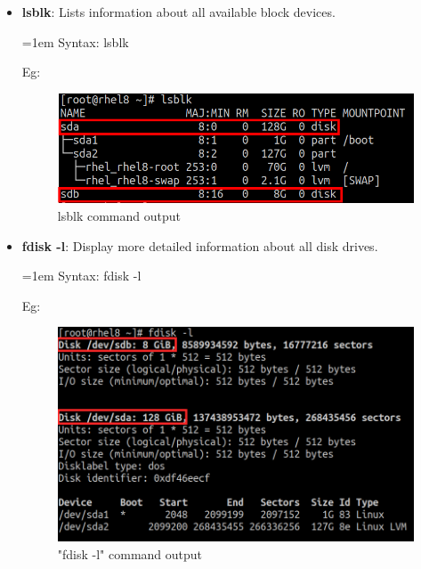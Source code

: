 \setlength{\columnsep}{3pt}
\begin{flushleft}

\bigskip
\begin{itemize}
	\item \textbf{lsblk}: Lists information about all available block devices.
	
	\bigskip
	\begin{tcolorbox}[breakable,notitle,boxrule=-0pt,colback=pink,colframe=pink]
		\color{black}
		\font=1em
		Syntax: lsblk
		\font=4pt
	\end{tcolorbox}
	Eg:
	\begin{figure}[h!]
		\centering
		\includegraphics[scale=0.45]{content/chapter8/images/lsblk.png}
		\caption{lsblk command output}
		\label{fig:lsblk}
	\end{figure}
	
	\item \textbf{fdisk -l}: Display more detailed information about all disk drives.
	\bigskip
	\begin{tcolorbox}[breakable,notitle,boxrule=-0pt,colback=pink,colframe=pink]
		\color{black}
		\font=1em
		Syntax: fdisk -l
		\font=4pt
	\end{tcolorbox}
	Eg:
	\begin{figure}[h!]
		\centering
		\includegraphics[scale=0.45]{content/chapter8/images/fdisk.png}
		\caption{"fdisk -l" command output}
		\label{fig:fdisk}
	\end{figure}
		
	
\end{itemize}
	
	
	
\end{flushleft}

\newpage


